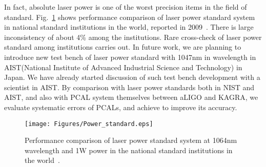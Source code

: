 In fact, absolute laser power is one of the worst precision items in the field of standard. Fig.~\ref{fig:Power_standard} shows performance comparison of laser power standard system in national standard institutions in the world, reported in 2009~\cite{EUROMET}. There is large inconsistency of about 4\% among the institutions. Rare cross-check of laser power standard among institutions carries out. In future work, we are planning to introduce new test bench of laser power standard with 1047nm in wavelength in AIST(National Institute of Advanced Industrial Science and Technology)  in Japan. We have already started discussion of such test bench development with a scientist in AIST. By comparison with laser power standards both in NIST and AIST, and also with PCAL system themselves between aLIGO and KAGRA, we evaluate systematic errors of PCALs, and achieve to improve its accuracy.


\begin{figure}
\begin{center}
\texttt{[image: Figures/Power\_standard.eps]}
\caption{
Performance comparison of laser power standard system at 1064nm wavelength and 1W power in the national standard institutions in the world~\cite{EUROMET}.
} 
\label{fig:Power_standard} 
\end{center}
\end{figure}

